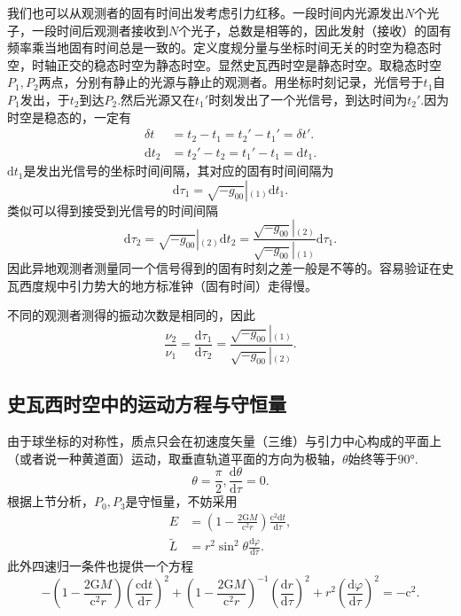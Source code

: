 \documentclass[11pt, a4paper, oneside, onecolumn]{ctexart}
\numberwithin{equation}{subsection}
\begin{document}
我们也可以从观测者的固有时间出发考虑引力红移。一段时间内光源发出$N$个光子，一段时间后观测者接收到$N$个光子，总数是相等的，因此发射（接收）的固有频率乘当地固有时间总是一致的。定义度规分量与坐标时间无关的时空为稳态时空，时轴正交的稳态时空为静态时空。显然史瓦西时空是静态时空。取稳态时空$P_{1},P_{2}$两点，分别有静止的光源与静止的观测者。用坐标时刻记录，光信号于$t_{1}$自$P_{1}$发出，于$t_{2}$到达$P_{2}$.然后光源又在$t_{1}'$时刻发出了一个光信号，到达时间为$t_{2}'$.因为时空是稳态的，一定有
\begin{align}
\delta{}t&=t_{2}-t_{1}=t_{2}'-t_{1}'=\delta{}t'.\\
\mathrm{d}t_{2}&=t_{2}'-t_{2}=t_{1}'-t_{1}=\mathrm{d}t_{1}.
\end{align}
$\mathrm{d}t_{1}$是发出光信号的坐标时间间隔，其对应的固有时间间隔为
\begin{equation}
\mathrm{d}\tau_{1}=\left.\sqrt{-g_{00}}\right\vert{}_{\left(1\right)}\mathrm{d}t_{1}.
\end{equation}
类似可以得到接受到光信号的时间间隔
\begin{equation}
\mathrm{d}\tau_{2}=\left.\sqrt{-g_{00}}\right\vert{}_{\left(2\right)}\mathrm{d}t_{2}=\frac{\left.\sqrt{-g_{00}}\right\vert{}_{\left(2\right)}}{\left.\sqrt{-g_{00}}\right\vert{}_{\left(1\right)}}\mathrm{d}\tau_{1}.
\end{equation}
因此异地观测者测量同一个信号得到的固有时刻之差一般是不等的。容易验证在史瓦西度规中引力势大的地方标准钟（固有时间）走得慢。

不同的观测者测得的振动次数是相同的，因此
\begin{equation}
\frac{\nu_{2}}{\nu_{1}}=\frac{\mathrm{d}\tau_{1}}{\mathrm{d}\tau_{2}}=\frac{\left.\sqrt{-g_{00}}\right\vert{}_{\left(1\right)}}{\left.\sqrt{-g_{00}}\right\vert{}_{\left(2\right)}}.
\end{equation}

\subsection{史瓦西时空中的运动方程与守恒量}
由于球坐标的对称性，质点只会在初速度矢量（三维）与引力中心构成的平面上（或者说一种黄道面）运动，取垂直轨道平面的方向为极轴，$\theta$始终等于$\ang{90;;}$.
\begin{equation}
\theta=\frac{\pi}{2},\frac{\mathrm{d}\theta}{\mathrm{d}\tau}=0.
\end{equation}
根据上节分析，$P_{0},P_{3}$是守恒量，不妨采用
\begin{align}
E&=\left(1-\frac{2\mathrm{G}M}{\mathrm{c}^{2}r}\right)\frac{\mathrm{c}^{2}\mathrm{d}t}{\mathrm{d}\tau},\\
\widetilde{L}&=r^{2}\sin^{2}\theta\frac{\mathrm{d}\varphi}{\mathrm{d}\tau}.
\end{align}
此外四速归一条件也提供一个方程
\begin{equation}
-\left(1-\frac{2\mathrm{G}M}{\mathrm{c}^{2}r}\right)\left(\frac{\mathrm{c}\mathrm{d}t}{\mathrm{d}\tau}\right)^{2}+\left(1-\frac{2\mathrm{G}M}{\mathrm{c}^{2}r}\right)^{-1}\left(\frac{\mathrm{d}r}{\mathrm{d}\tau}\right)^{2}+r^{2}\left(\frac{\mathrm{d}\varphi}{\mathrm{d}\tau}\right)^{2}=-\mathrm{c}^{2}.\label{4.4.4}
\end{equation}
\end{document}
